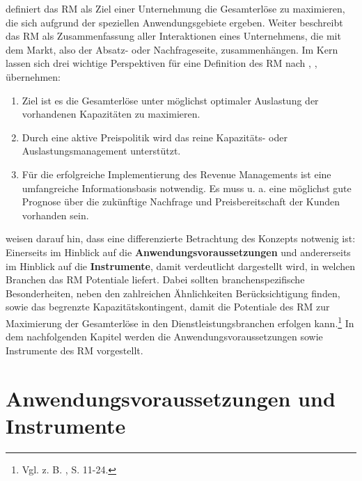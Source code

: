\cite{Petrick:2009aa} definiert das RM als Ziel einer Unternehmung die Gesamterlöse zu maximieren, die sich aufgrund der speziellen Anwendungsgebiete ergeben. Weiter beschreibt \cite{Petrick:2009aa} das RM als Zusammenfassung aller Interaktionen eines Unternehmens, die mit dem Markt, also der Absatz- oder Nachfrageseite, zusammenhängen. Im Kern lassen sich drei wichtige Perspektiven für eine Definition des RM nach \cite{Petrick:2009aa}, \cite{stuhlmann2000kapazitatsgestaltung},  \cite{corsten1999yield} übernehmen:
\begin{enumerate}
	\item Ziel ist es die Gesamterlöse unter möglichst optimaler Auslastung der vorhandenen Kapazitäten zu maximieren.
	\item Durch eine aktive Preispolitik wird das reine Kapazitäts- oder Auslastungsmanagement unterstützt.
	\item Für die erfolgreiche Implementierung des Revenue Managements ist eine umfangreiche Informationsbasis notwendig. Es muss u. a. eine möglichst gute Prognose über die zukünftige Nachfrage und Preisbereitschaft der Kunden vorhanden sein.
\end{enumerate}

\cite{kimms2005revenue} weisen darauf hin, dass eine differenzierte Betrachtung des Konzepts notwenig ist: Einerseits im Hinblick auf die \textbf{Anwendungsvoraussetzungen} und andererseits im Hinblick auf die \textbf{Instrumente}, damit verdeutlicht dargestellt wird, in welchen Branchen das RM Potentiale liefert. Dabei sollten branchenspezifische Besonderheiten, neben den zahlreichen Ähnlichkeiten Berücksichtigung finden, sowie das begrenzte Kapazitätskontingent, damit die Potentiale des RM zur Maximierung der Gesamterlöse in den Dienstleistungsbranchen erfolgen kann.\footnote{Vgl. z. B. \cite{Martens:2009aa}, S. 11-24.} In dem nachfolgenden Kapitel werden die Anwendungsvoraussetzungen sowie Instrumente des RM vorgestellt.

\section{Anwendungsvoraussetzungen und Instrumente}

